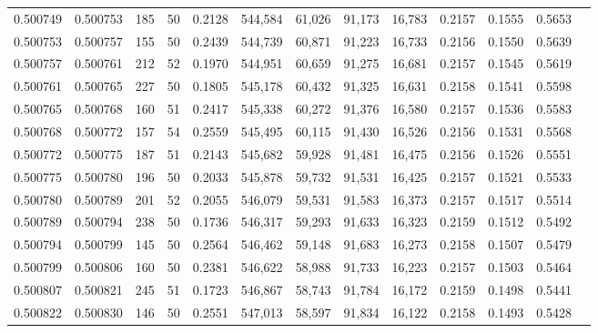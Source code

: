 \begin{tabular}{rrrrrrrrrrrrr}
0.500749 & 0.500753 & 185 &  50 &                                     0.2128 & 544,584 &  61,026 &  91,173 &  16,783 & 0.2157 & 0.1555 & 0.5653 \\
0.500753 & 0.500757 & 155 &  50 &                                     0.2439 & 544,739 &  60,871 &  91,223 &  16,733 & 0.2156 & 0.1550 & 0.5639 \\
0.500757 & 0.500761 & 212 &  52 &                                     0.1970 & 544,951 &  60,659 &  91,275 &  16,681 & 0.2157 & 0.1545 & 0.5619 \\
0.500761 & 0.500765 & 227 &  50 &                                     0.1805 & 545,178 &  60,432 &  91,325 &  16,631 & 0.2158 & 0.1541 & 0.5598 \\
0.500765 & 0.500768 & 160 &  51 &                                     0.2417 & 545,338 &  60,272 &  91,376 &  16,580 & 0.2157 & 0.1536 & 0.5583 \\
0.500768 & 0.500772 & 157 &  54 &                                     0.2559 & 545,495 &  60,115 &  91,430 &  16,526 & 0.2156 & 0.1531 & 0.5568 \\
0.500772 & 0.500775 & 187 &  51 &                                     0.2143 & 545,682 &  59,928 &  91,481 &  16,475 & 0.2156 & 0.1526 & 0.5551 \\
0.500775 & 0.500780 & 196 &  50 &                                     0.2033 & 545,878 &  59,732 &  91,531 &  16,425 & 0.2157 & 0.1521 & 0.5533 \\
0.500780 & 0.500789 & 201 &  52 &                                     0.2055 & 546,079 &  59,531 &  91,583 &  16,373 & 0.2157 & 0.1517 & 0.5514 \\
0.500789 & 0.500794 & 238 &  50 &                                     0.1736 & 546,317 &  59,293 &  91,633 &  16,323 & 0.2159 & 0.1512 & 0.5492 \\
0.500794 & 0.500799 & 145 &  50 &                                     0.2564 & 546,462 &  59,148 &  91,683 &  16,273 & 0.2158 & 0.1507 & 0.5479 \\
0.500799 & 0.500806 & 160 &  50 &                                     0.2381 & 546,622 &  58,988 &  91,733 &  16,223 & 0.2157 & 0.1503 & 0.5464 \\
0.500807 & 0.500821 & 245 &  51 &                                     0.1723 & 546,867 &  58,743 &  91,784 &  16,172 & 0.2159 & 0.1498 & 0.5441 \\
0.500822 & 0.500830 & 146 &  50 &                                     0.2551 & 547,013 &  58,597 &  91,834 &  16,122 & 0.2158 & 0.1493 & 0.5428 \\

\end{tabular}
